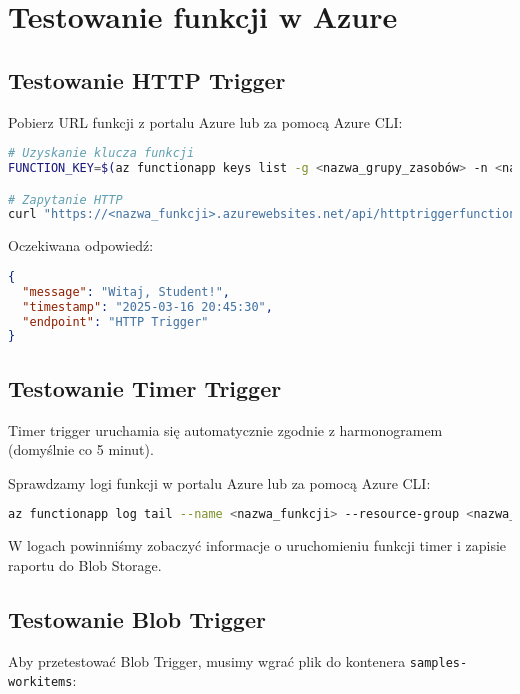 \documentclass{article}
\begin{document}
\section{Testowanie funkcji w Azure}

\subsection{Testowanie HTTP Trigger}

Pobierz URL funkcji z portalu Azure lub za pomocą Azure CLI:

\begin{lstlisting}[language=bash]
# Uzyskanie klucza funkcji
FUNCTION_KEY=$(az functionapp keys list -g <nazwa_grupy_zasobów> -n <nazwa_funkcji> --query "functionKeys.default" -o tsv)

# Zapytanie HTTP
curl "https://<nazwa_funkcji>.azurewebsites.net/api/httptriggerfunction?name=Student&code=$FUNCTION_KEY"
\end{lstlisting}

Oczekiwana odpowiedź:
\begin{lstlisting}[language=json]
{
  "message": "Witaj, Student!",
  "timestamp": "2025-03-16 20:45:30",
  "endpoint": "HTTP Trigger"
}
\end{lstlisting}

\subsection{Testowanie Timer Trigger}

Timer trigger uruchamia się automatycznie zgodnie z harmonogramem (domyślnie co 5 minut).

Sprawdzamy logi funkcji w portalu Azure lub za pomocą Azure CLI:

\begin{lstlisting}[language=bash]
az functionapp log tail --name <nazwa_funkcji> --resource-group <nazwa_grupy_zasobów>
\end{lstlisting}

W logach powinniśmy zobaczyć informacje o uruchomieniu funkcji timer i zapisie raportu do Blob Storage.

\subsection{Testowanie Blob Trigger}

Aby przetestować Blob Trigger, musimy wgrać plik do kontenera \texttt{samples-workitems}:
\end{document}
